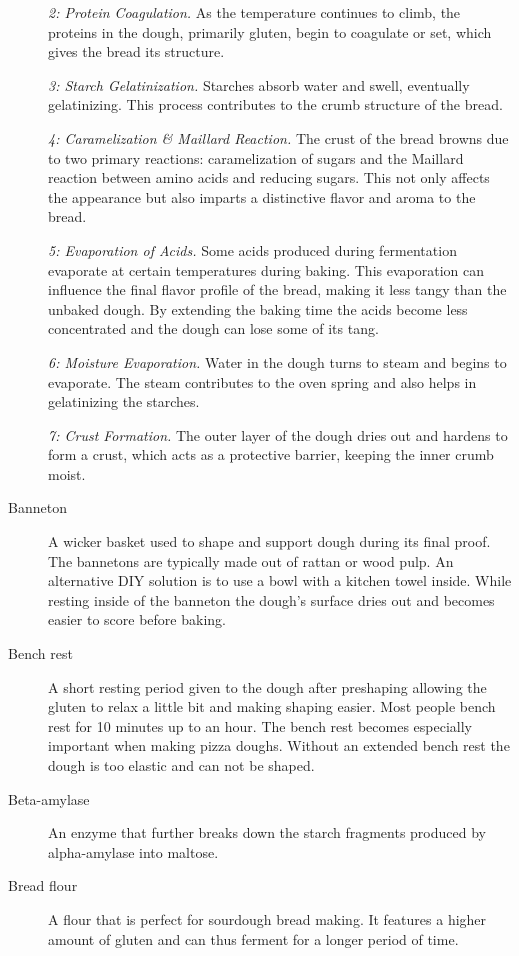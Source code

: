 \begin{description}
\emph{2: Protein Coagulation.}  As the temperature continues to climb, the proteins
in the dough, primarily gluten, begin to coagulate or set, which gives the bread its
structure.

\emph{3: Starch Gelatinization.}  Starches absorb water and swell, eventually
gelatinizing. This process contributes to the crumb structure of the bread.

\emph{4: Caramelization \& Maillard Reaction.}  The crust of the bread browns due
to two primary reactions: caramelization of sugars and the Maillard reaction between
amino acids and reducing sugars. This not only affects the appearance but also imparts
a distinctive flavor and aroma to the bread.

\emph{5: Evaporation of Acids.} Some acids produced during fermentation evaporate at
certain temperatures during baking. This evaporation can influence the final flavor
profile of the bread, making it less tangy than the unbaked dough. By extending the
baking time the acids become less concentrated and the dough can lose some of its tang.

\emph{6: Moisture Evaporation.} Water in the dough turns to steam and begins to
evaporate. The steam contributes to the oven spring and also helps in gelatinizing
the starches.

\emph{7: Crust Formation.} The outer layer of the dough dries out and hardens to
form a crust, which acts as a protective barrier, keeping the inner crumb moist.

\item[Banneton] A wicker basket used to shape and support dough during its final
proof. The bannetons are typically made out of rattan or wood pulp. An alternative
DIY solution is to use a bowl with a kitchen towel inside. While resting inside of
the banneton the dough’s surface dries out and becomes easier to score before baking.

\item[Bench rest] A short resting period given to the dough after preshaping
allowing the gluten to relax a little bit and making shaping easier. Most people
bench rest for 10 minutes up to an hour. The bench rest becomes especially important
when making pizza doughs. Without an extended bench rest the dough is too elastic and
can not be shaped.

\item[Beta-amylase] An enzyme that further breaks down the starch fragments
produced by alpha-amylase into maltose.

\item[Bread flour] A flour that is perfect for sourdough bread making. It features
a higher amount of gluten and can thus ferment for a longer period of time.


\end{description}
